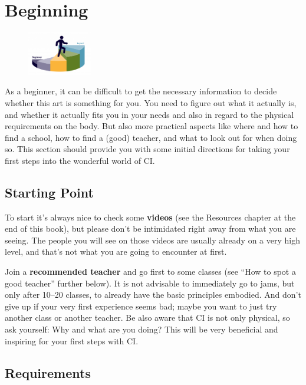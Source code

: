\section{Beginning}\label{sec:beginning}

\begin{figure}
    \centering
    \includegraphics[width=0.25\textwidth]{images/beginning}
\end{figure}

As a beginner, it can be difficult to get the necessary information to decide whether this art is something for you.
You need to figure out what it actually is, and whether it actually fits you in your needs and also in regard to the physical requirements on the body.
But also more practical aspects like where and how to find a school, how to find a (good) teacher, and what to look out for when doing so.
This section should provide you with some initial directions for taking your first steps into the wonderful world of CI\@.

\subsection{Starting Point}\label{subsec:starting-point}

To start it's always nice to check some \textbf{videos} (see the Resources chapter at the end of this book), but please don't be intimidated right away from what you are seeing.
The people you will see on those videos are usually already on a very high level, and that's not what you are going to encounter at first.

Join a \textbf{recommended teacher} and go first to some classes (see ``How to spot a good teacher'' further below).
It is not advisable to immediately go to jams, but only after 10--20 classes, to already have the basic principles embodied.
And don't give up if your very first experience seems bad; maybe you want to just try another class or another teacher.
Be also aware that CI is not only physical, so ask yourself: Why and what are you doing?
This will be very beneficial and inspiring for your first steps with CI\@.

\subsection{Requirements}\label{subsec:requirements}


